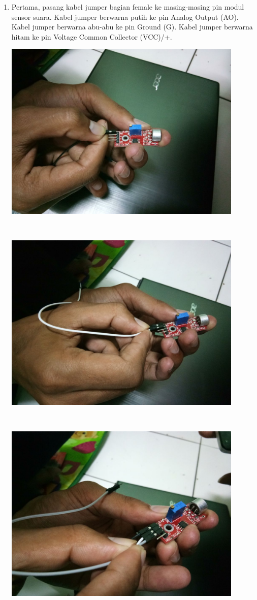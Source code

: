 \begin{enumerate}

\item  Pertama, pasang kabel jumper bagian female ke masing-masing pin modul sensor suara. Kabel jumper berwarna putih ke pin Analog Output (AO). Kabel jumper berwarna abu-abu ke pin Ground (G). Kabel jumper berwarna hitam ke pin Voltage Common Collector (VCC)/+.
\break\\
\centerline{\includegraphics[width=0.9\textwidth]{figures/ss4.jpeg}}
\break\\
\centerline{\includegraphics[width=0.9\textwidth]{figures/ss5.jpeg}}
\break\\
\centerline{\includegraphics[width=0.9\textwidth]{figures/ss6.jpeg}}

\end{enumerate}
